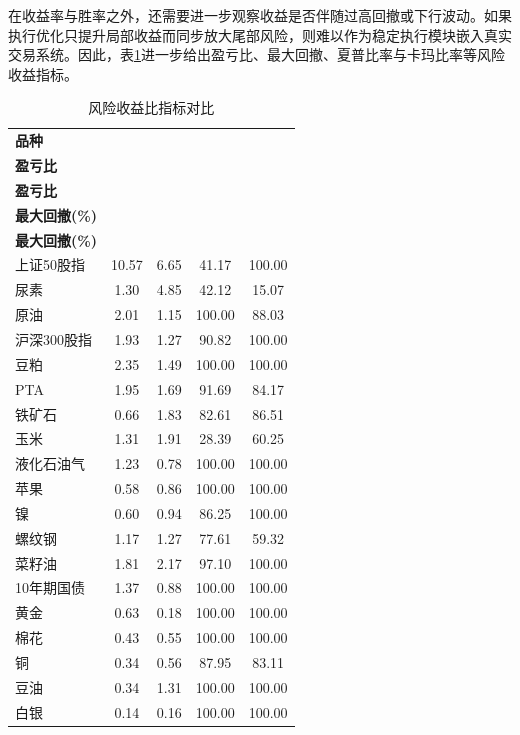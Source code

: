 在收益率与胜率之外，还需要进一步观察收益是否伴随过高回撤或下行波动。如果执行优化只提升局部收益而同步放大尾部风险，则难以作为稳定执行模块嵌入真实交易系统。因此，表\ref{tab:twinriskReturn_new}进一步给出盈亏比、最大回撤、夏普比率与卡玛比率等风险收益指标。

\FloatBarrier

\begin{table}[!htbp]
\centering
\caption{风险收益比指标对比}
\label{tab:twinriskReturn_new}
\small
\setlength{\tabcolsep}{6pt}
\renewcommand{\arraystretch}{1.18}
\begin{tabular}{lcccc}
\toprule
\textbf{品种} & \makecell{\textbf{孪生对抗}\\\textbf{盈亏比}} & \makecell{\textbf{基准模型}\\\textbf{盈亏比}} & \makecell{\textbf{孪生对抗}\\\textbf{最大回撤(\%)}} & \makecell{\textbf{基准模型}\\\textbf{最大回撤(\%)}} \\
\midrule
上证50股指 & 10.57 & 6.65 & 41.17 & 100.00 \\
尿素 & 1.30 & 4.85 & 42.12 & 15.07 \\
原油 & 2.01 & 1.15 & 100.00 & 88.03 \\
沪深300股指 & 1.93 & 1.27 & 90.82 & 100.00 \\
豆粕 & 2.35 & 1.49 & 100.00 & 100.00 \\
PTA & 1.95 & 1.69 & 91.69 & 84.17 \\
铁矿石 & 0.66 & 1.83 & 82.61 & 86.51 \\
玉米 & 1.31 & 1.91 & 28.39 & 60.25 \\
液化石油气 & 1.23 & 0.78 & 100.00 & 100.00 \\
苹果 & 0.58 & 0.86 & 100.00 & 100.00 \\
镍 & 0.60 & 0.94 & 86.25 & 100.00 \\
螺纹钢 & 1.17 & 1.27 & 77.61 & 59.32 \\
菜籽油 & 1.81 & 2.17 & 97.10 & 100.00 \\
10年期国债 & 1.37 & 0.88 & 100.00 & 100.00 \\
黄金 & 0.63 & 0.18 & 100.00 & 100.00 \\
棉花 & 0.43 & 0.55 & 100.00 & 100.00 \\
铜 & 0.34 & 0.56 & 87.95 & 83.11 \\
豆油 & 0.34 & 1.31 & 100.00 & 100.00 \\
白银 & 0.14 & 0.16 & 100.00 & 100.00 \\
\bottomrule
\end{tabular}
\end{table}
